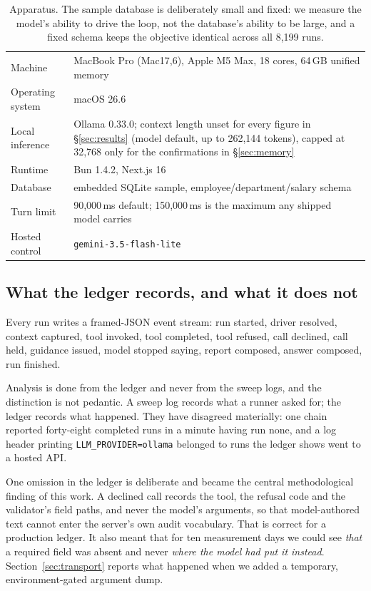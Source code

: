\documentclass[11pt]{article}
\newcommand{\code}[1]{\texttt{\small #1}}
\begin{document}
\begin{table}[htbp]
\centering\small
\begin{tabular}{@{}l p{11.4cm}@{}}
\toprule
Machine & MacBook Pro (Mac17,6), Apple M5 Max, 18 cores, 64\,GB unified memory \\
Operating system & macOS 26.6 \\
Local inference & Ollama 0.33.0; context length unset for every figure in \S\ref{sec:results} (model default,
up to 262{,}144 tokens), capped at 32{,}768 only for the confirmations in \S\ref{sec:memory} \\
Runtime & Bun 1.4.2, Next.js 16 \\
Database & embedded SQLite sample, employee/department/salary schema \\
Turn limit & 90{,}000\,ms default; 150{,}000\,ms is the maximum any shipped model carries \\
Hosted control & \code{gemini-3.5-flash-lite} \\
\bottomrule
\end{tabular}
\caption{Apparatus. The sample database is deliberately small and fixed: we measure the model's ability to drive
the loop, not the database's ability to be large, and a fixed schema keeps the objective identical across all
8{,}199 runs.}
\end{table}

\subsection{What the ledger records, and what it does not}

Every run writes a framed-JSON event stream: run started, driver resolved, context captured, tool invoked, tool
completed, tool refused, call declined, call held, guidance issued, model stopped saying, report composed, answer
composed, run finished.

Analysis is done from the ledger and never from the sweep logs, and the distinction is not pedantic. A sweep log
records what a runner asked for; the ledger records what happened. They have disagreed materially: one chain
reported forty-eight completed runs in a minute having run none, and a log header printing \code{LLM\_PROVIDER=ollama}
belonged to runs the ledger shows went to a hosted API.

One omission in the ledger is deliberate and became the central methodological finding of this work. A declined
call records the tool, the refusal code and the validator's field paths, and never the model's arguments, so that
model-authored text cannot enter the server's own audit vocabulary. That is correct for a production ledger. It
also meant that for ten measurement days we could see \emph{that} a required field was absent and never
\emph{where the model had put it instead}. Section~\ref{sec:transport} reports what happened when we added a
temporary, environment-gated argument dump.
\end{document}
